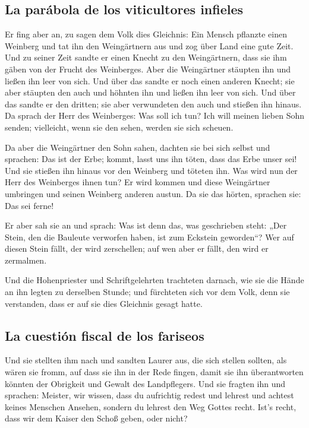 \hypertarget{la-paruxe1bola-de-los-viticultores-infieles}{%
\subsection{La parábola de los viticultores
infieles}\label{la-paruxe1bola-de-los-viticultores-infieles}}

 Er fing aber an, zu sagen dem Volk dies Gleichnis: Ein
Mensch pflanzte einen Weinberg und tat ihn den Weingärtnern aus und zog
über Land eine gute Zeit.  Und zu seiner Zeit sandte er
einen Knecht zu den Weingärtnern, dass sie ihm gäben von der Frucht des
Weinberges. Aber die Weingärtner stäupten ihn und ließen ihn leer von
sich.  Und über das sandte er noch einen anderen Knecht;
sie aber stäupten den auch und höhnten ihn und ließen ihn leer von sich.
 Und über das sandte er den dritten; sie aber verwundeten
den auch und stießen ihn hinaus.  Da sprach der Herr des
Weinberges: Was soll ich tun? Ich will meinen lieben Sohn senden;
vielleicht, wenn sie den sehen, werden sie sich scheuen.

 Da aber die Weingärtner den Sohn sahen, dachten sie bei
sich selbst und sprachen: Das ist der Erbe; kommt, lasst uns ihn töten,
dass das Erbe unser sei!  Und sie stießen ihn hinaus vor
den Weinberg und töteten ihn. Was wird nun der Herr des Weinberges ihnen
tun?  Er wird kommen und diese Weingärtner umbringen und
seinen Weinberg anderen austun. Da sie das hörten, sprachen sie: Das sei
ferne!

 Er aber sah sie an und sprach: Was ist denn das, was
geschrieben steht: „Der Stein, den die Bauleute verworfen haben, ist zum
Eckstein geworden``?  Wer auf diesen Stein fällt, der
wird zerschellen; auf wen aber er fällt, den wird er zermalmen.

 Und die Hohenpriester und Schriftgelehrten trachteten
darnach, wie sie die Hände an ihn legten zu derselben Stunde; und
fürchteten sich vor dem Volk, denn sie verstanden, dass er auf sie dies
Gleichnis gesagt hatte.

\hypertarget{la-cuestiuxf3n-fiscal-de-los-fariseos}{%
\subsection{La cuestión fiscal de los
fariseos}\label{la-cuestiuxf3n-fiscal-de-los-fariseos}}

 Und sie stellten ihm nach und sandten Laurer aus, die
sich stellen sollten, als wären sie fromm, auf dass sie ihn in der Rede
fingen, damit sie ihn überantworten könnten der Obrigkeit und Gewalt des
Landpflegers.  Und sie fragten ihn und sprachen: Meister,
wir wissen, dass du aufrichtig redest und lehrest und achtest keines
Menschen Ansehen, sondern du lehrest den Weg Gottes recht.
 Ist's recht, dass wir dem Kaiser den Schoß geben, oder
nicht?


